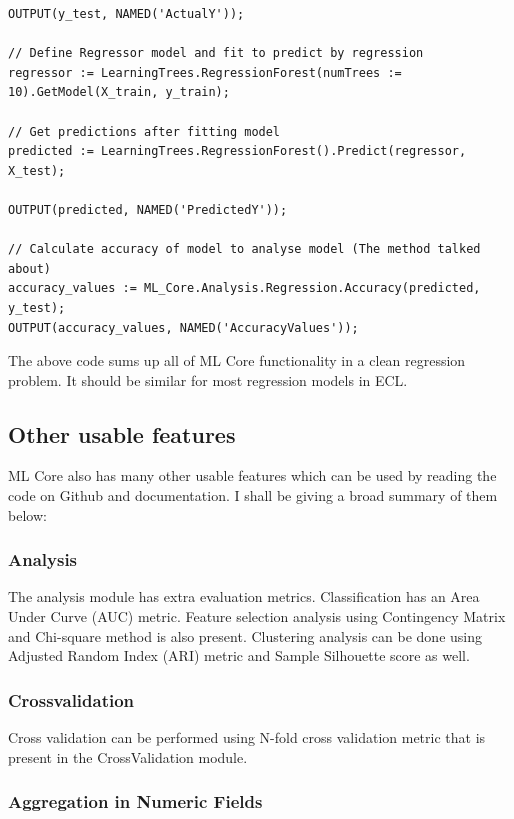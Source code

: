 \begin{lstlisting}
OUTPUT(y_test, NAMED('ActualY'));

// Define Regressor model and fit to predict by regression
regressor := LearningTrees.RegressionForest(numTrees := 10).GetModel(X_train, y_train);

// Get predictions after fitting model
predicted := LearningTrees.RegressionForest().Predict(regressor, X_test);

OUTPUT(predicted, NAMED('PredictedY'));

// Calculate accuracy of model to analyse model (The method talked about)
accuracy_values := ML_Core.Analysis.Regression.Accuracy(predicted, y_test);
OUTPUT(accuracy_values, NAMED('AccuracyValues'));
\end{lstlisting}

The above code sums up all of ML Core functionality in a clean regression problem. It should be similar for most regression models in ECL.

\subsection{Other usable features}

ML Core also has many other usable features which can be used by reading the code on Github and documentation. I shall be giving a broad summary of them below:

\subsubsection{Analysis}

The analysis module has extra evaluation metrics. Classification has an Area Under Curve (AUC) metric. Feature selection analysis using Contingency Matrix and Chi-square method is also present. Clustering analysis can be done using Adjusted Random Index (ARI) metric and Sample Silhouette score as well.

\subsubsection{Crossvalidation}

Cross validation can be performed using N-fold cross validation metric that is present in the CrossValidation module.

\subsubsection{Aggregation in Numeric Fields}

